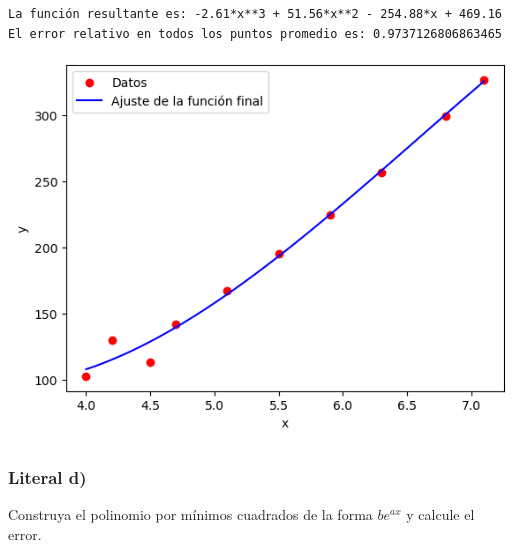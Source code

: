 \documentclass[
  letterpaper,
  DIV=11,
  numbers=noendperiod]{scrartcl}
\begin{document}
\begin{verbatim}
La función resultante es: -2.61*x**3 + 51.56*x**2 - 254.88*x + 469.16
El error relativo en todos los puntos promedio es: 0.9737126806863465
\end{verbatim}

\includegraphics{Tarea8_MN_files/figure-pdf/cell-6-output-2.png}

\subsubsection{Literal d)}\label{literal-d}

Construya el polinomio por mínimos cuadrados de la forma \(be^{ax}\) y
calcule el error.
\end{document}
